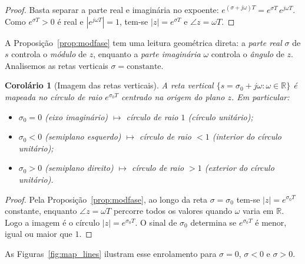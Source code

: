 \documentclass[11pt,a4paper,oneside]{book}
\theoremstyle{definition}
\theoremstyle{plain}
\newtheorem{corolario}{Corolário}[chapter]
\begin{document}
\begin{proof}
Basta separar a parte real e imaginária no expoente:
$e^{(\sigma+j\omega)T}=e^{\sigma T}\,e^{j\omega T}$. Como $e^{\sigma T}>0$ é real e
$|e^{j\omega T}|=1$, tem-se $|z|=e^{\sigma T}$ e $\angle z=\omega T$.
\end{proof}

A Proposição~\ref{prop:modfase} tem uma leitura geométrica direta: a
\emph{parte real} $\sigma$ de $s$ controla o \emph{módulo} de $z$, enquanto a
\emph{parte imaginária} $\omega$ controla o \emph{ângulo} de $z$. Analisemos as
retas verticais $\sigma=\text{constante}$.

\begin{corolario}[Imagem das retas verticais]
\label{cor:retas}
A reta vertical $\{s=\sigma_0+j\omega:\omega\in\mathbb{R}\}$ é mapeada no círculo
de raio $e^{\sigma_0 T}$ centrado na origem do plano $z$. Em particular:
\begin{itemize}[nosep]
    \item $\sigma_0=0$ (eixo imaginário) $\mapsto$ círculo de raio $1$ (círculo
    unitário);
    \item $\sigma_0<0$ (semiplano esquerdo) $\mapsto$ círculo de raio $<1$
    (interior do círculo unitário);
    \item $\sigma_0>0$ (semiplano direito) $\mapsto$ círculo de raio $>1$
    (exterior do círculo unitário).
\end{itemize}
\end{corolario}

\begin{proof}
Pela Proposição~\ref{prop:modfase}, ao longo da reta $\sigma=\sigma_0$ tem-se
$|z|=e^{\sigma_0 T}$ constante, enquanto $\angle z=\omega T$ percorre todos os
valores quando $\omega$ varia em $\mathbb{R}$. Logo a imagem é o círculo
$|z|=e^{\sigma_0 T}$. O sinal de $\sigma_0$ determina se $e^{\sigma_0 T}$ é menor,
igual ou maior que $1$.
\end{proof}

As Figuras~\ref{fig:map_lines} ilustram esse enrolamento para $\sigma=0$,
$\sigma<0$ e $\sigma>0$.
\end{document}
